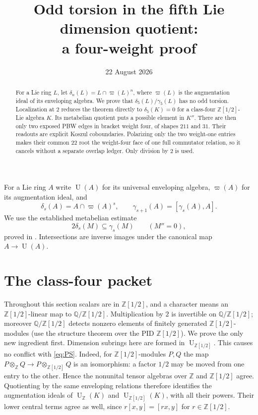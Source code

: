 \documentclass[10pt,a4paper]{amsart}
\title[Odd torsion in the fifth Lie dimension quotient]
{Odd torsion in the fifth Lie dimension quotient:\\
a four-weight proof}
\author{}
\date{22 August 2026}
\theoremstyle{remark}
\newcommand{\Z}{\mathbb Z}
\newcommand{\R}{\mathbb Z[1/2]}
\newcommand{\E}{\mathbb Q/\mathbb Z[1/2]}
\newcommand{\U}{\operatorname U}
\newcommand{\aug}{\varpi}
\newcommand{\dlt}{\delta}
\newcommand{\gm}{\gamma}
\begin{document}
\begin{abstract}
For a Lie ring $L$, let
$\delta_n(L)=L\cap\varpi(L)^n$, where $\varpi(L)$ is the augmentation
ideal of its enveloping algebra.  We prove that
$\delta_5(L)/\gamma_5(L)$ has no odd torsion.  Localization at $2$
reduces the theorem directly to $\delta_5(K)=0$ for a class-four
$\mathbb Z[1/2]$-Lie algebra $K$.  Its metabelian quotient puts a
possible element in $K''$.  There are then only two exposed PBW edges
in bracket weight four, of shapes $211$ and $31$.  Their readouts are
explicit Koszul coboundaries.  Polarizing only the two weight-one
entries makes their common $22$ root the weight-four face of one full
commutator relation, so it cancels without a separate overlap ledger.
Only division by $2$ is used.
\end{abstract}

\maketitle

For a Lie ring $A$ write $\U(A)$ for its universal enveloping algebra,
$\aug(A)$ for its augmentation ideal, and
\[
 \dlt_s(A)=A\cap\aug(A)^s,
 \qquad \gm_{s+1}(A)=[\gm_s(A),A].
\]
We use the established metabelian estimate
\begin{equation}
                 2\dlt_s(M)\subseteq\gm_s(M)
                 \qquad(M''=0),                         \label{eq:PS}
\end{equation}
proved in \cite[Theorem 2.1]{PS}.  Intersections are inverse images
under the canonical map $A\to\U(A)$.

\section{The class-four packet}

Throughout this section scalars are in $\R$, and a character means an
$\R$-linear map to $\E$.  Multiplication by $2$ is invertible on $\E$;
moreover $\E$
detects nonzero elements of finitely generated $\R$-modules (use the
structure theorem over the PID $\R$).  We prove the only new ingredient
first.  Dimension subrings here are formed in $\U_{\R}$.  This causes no
conflict with \eqref{eq:PS}.  Indeed, for $\R$-modules $P,Q$ the map
$P\otimes_{\Z}Q\to P\otimes_{\R}Q$ is an isomorphism: a factor $1/2$
may be moved from one entry to the other.  Hence the nonunital tensor
algebras over $\Z$ and $\R$ agree.  Quotienting by the same enveloping
relations therefore identifies the augmentation ideals of
$\U_{\Z}(K)$ and $\U_{\R}(K)$, with all their powers.  Their lower
central terms agree as well, since $r[x,y]=[rx,y]$ for $r\in\R$.
\end{document}
